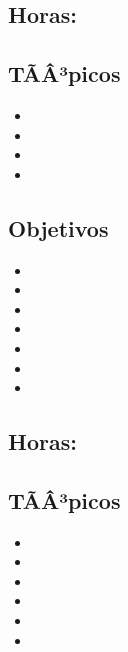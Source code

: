 \subsection{\OSCUATRODef}\label{sec:BOK-OS4}
\subsection*{Horas: \OSCUATROHours}

\subsection*{TÃÂ³picos}
\begin{itemize}
	\item \OSCUATROTopicPlaneamiento
	\item \OSCUATROTopicPlaneamientoy
	\item \OSCUATROTopicProcesos
	\item \OSCUATROTopicDeadlines
\end{itemize}

\subsection*{Objetivos}
\begin{itemize}
	\item \OSCUATROObjUNO
	\item \OSCUATROObjDOS
	\item \OSCUATROObjTRES
	\item \OSCUATROObjCUATRO
	\item \OSCUATROObjCINCO
	\item \OSCUATROObjSEIS
	\item \OSCUATROObjSIETE
\end{itemize}

\subsection{\OSCINCODef}\label{sec:BOK-OS5}
\subsection*{Horas: \OSCINCOHours}

\subsection*{TÃÂ³picos}
\begin{itemize}
	\item \OSCINCOTopicRevision
	\item \OSCINCOTopicRetardos
	\item \OSCINCOTopicPaginamiento
	\item \OSCINCOTopicPoliticas
	\item \OSCINCOTopicConjuntos
	\item \OSCINCOTopicCaching
\end{itemize}

